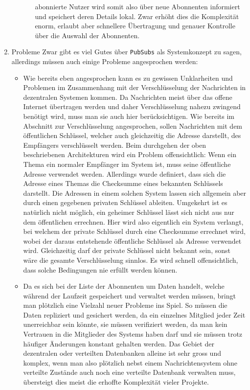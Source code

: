 \documentclass[a4paper,11pt,titlepage,twoside]{memoir}
\begin{document}
\begin{enumerate}
\begin{itemize}
\begin{itemize}
abonnierte Nutzer wird somit also über neue Abonnenten informiert
und speichert deren Details lokal. Zwar erhöht dies die
Komplexität enorm, erlaubt aber schnellere Übertragung und genauer
Kontrolle über die Auswahl der Abonnenten.
\end{itemize}
\end{itemize}
\item Probleme
\label{sec:orgd904aa1}
Zwar gibt es viel Gutes über \texttt{PubSubs} als Systemkonzept zu sagen,
allerdings müssen auch einige Probleme angesprochen werden:
\begin{itemize}
\item Wie bereits eben angesprochen kann es zu gewissen Unklarheiten und
Problemen im Zusammenhang mit der Verschlüsselung der Nachrichten in
dezentralen Systemen kommen. Da Nachrichten meist über das offene
Internet übertragen werden und daher Verschlüsselung nahezu zwingend
benötigt wird, muss man sie auch hier berücksichtigen. Wie bereits
im Abschnitt zur Verschlüsselung angesprochen, sollen Nachrichten
mit dem öffentlichen Schlüssel, welcher auch gleichzeitig die
Adresse darstellt, des Empfängers verschlüsselt werden. Beim
durchgehen der oben beschriebenen Architekturen wird ein Problem
offensichtlich: Wenn ein Thema ein normaler Empfänger im System ist,
muss seine öffentliche Adresse verwendet werden. Allerdings wurde
definiert, dass sich die Adresse eines Themas die Checksumme eines
bekannten Schlüssels darstellt. Die Adressen in einem solchen System
lassen sich allgemein aber durch einen gegebenen privaten Schlüssel
ableiten. Umgekehrt ist es natürlich nicht möglich, ein geheimer
Schlüssel lässt sich nicht aus nur dem öffentlichen errechnen. Hier
wird also eigentlich ein System verlangt, bei welchem der private
Schlüssel durch eine Checksumme errechnet wird, wobei der daraus
entstehende öffentliche Schlüssel als Adresse verwendet wird.
Gleichzeitig darf der private Schlüssel nicht bekannt sein, sonst
wäre die gesamte Verschlüsselung sinnlos. Es wird schnell
offensichtlich, dass solche Bedingungen nie erfüllt werden können.
\item Da es sich bei der Liste der Abonnenten um Daten handelt, welche
während der Laufzeit gespeichert und verwaltet werden müssen, bringt
man plötzlich eine Vielzahl neuer Probleme ins Spiel. So müssen die
Daten repliziert und gesichert werden, da ein einzelnes Mitglied
jeder Zeit unerreichbar sein könnte, sie müssen verifiziert werden,
da man kein Vertrauen in die Mitglieder des Systems haben darf und
sie müssen trotz häufiger Änderungen konstant gehalten werden. Das
Gebiet der dezentralen oder verteilten Datenbanken alleine ist sehr
gross und komplex, wenn man also plötzlich nebst einem
Nachrichtensystem ohne verteilte Zustände auch noch eine verteilte
Datenbank verwalten muss, übersteigt dies meist die erhoffte
Komplexität vieler Projekte.
\end{itemize}
\end{enumerate}
\end{document}
